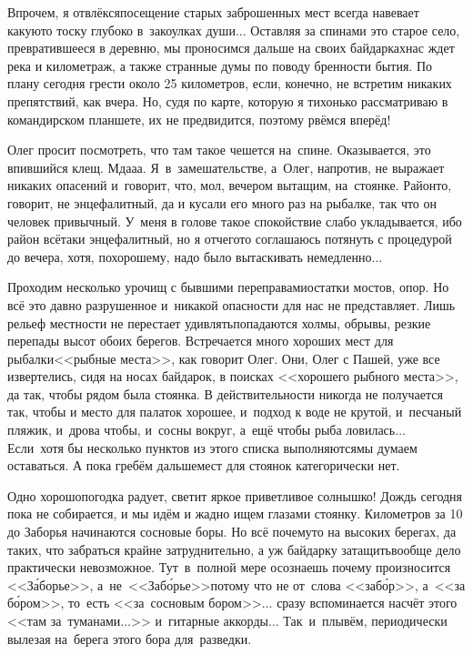 Впрочем, я отвлёкся\mdash посещение старых заброшенных мест всегда навевает какую\sdash то тоску глубоко в~закоулках души$\ldots$ Оставляя за спинами это старое село, превратившееся в деревню, мы проносимся дальше на своих байдарках\mdash нас ждет река и километраж, а также странные думы по поводу бренности бытия. По плану сегодня грести около 25 километров, если, конечно, не встретим никаких препятствий, как вчера. Но, судя по карте, которую я тихонько рассматриваю в командирском планшете, их не предвидится, поэтому рвёмся вперёд!

Олег просит посмотреть, что там такое чешется на~спине. Оказывается, это впившийся клещ. Мда\sdash а\sdash а. Я~в~замешательстве, а~Олег, напротив, не выражает никаких опасений и~говорит, что, мол, вечером вытащим, на~стоянке. Район\sdash то, говорит, не энцефалитный, да и кусали его много раз на рыбалке, так что он человек привычный. У~меня в голове такое спокойствие слабо укладывается, ибо район всё\sdash таки энцефалитный, но я отчего\sdash то соглашаюсь потянуть с процедурой до вечера, хотя, по\sdash хорошему, надо было вытаскивать немедленно$\ldots$

Проходим несколько урочищ с бывшими переправами\mdash остатки мостов, опор. Но всё это давно разрушенное и~никакой опасности для нас не представляет. Лишь рельеф местности не перестает удивлять\mdash попадаются холмы, обрывы, резкие перепады высот обоих берегов. Встречается много хороших мест для рыбалки\mdash <<рыбные места>>, как говорит Олег. Они, Олег с Пашей, уже все извертелись, сидя на носах байдарок, в поисках <<хорошего рыбного места>>, да так, чтобы рядом была стоянка. В действительности никогда не получается так, чтобы и место для палаток хорошее, и~подход к воде не крутой, и~песчаный пляжик, и~дрова чтобы, и~сосны вокруг, а~ещё чтобы рыба ловилась$\ldots$ Если~хотя бы несколько пунктов из этого списка выполняются\mdash мы думаем оставаться. А пока гребём дальше\mdash мест для стоянок категорически нет.

Одно хорошо\mdash погодка радует, светит яркое приветливое солнышко! Дождь сегодня пока не собирается, и мы идём и жадно ищем глазами стоянку. Километров за 10 до Заборья начинаются сосновые боры. Но всё почему\sdash то на высоких берегах, да таких, что забраться крайне затруднительно, а уж байдарку затащить\mdash вообще дело практически невозможное. Тут~в~полной мере осознаешь почему произносится <<З\'{а}борье>>, а~не~<<Заб\'{о}рье>>\mdash потому что не от~слова <<заб\'{о}р>>, а~<<за б\'{о}ром>>, то~есть <<за~сосновым бором>>$\ldots$ сразу вспоминается насчёт этого <<там за~туманами$\ldots$>> и~гитарные аккорды$\ldots$ Так~и~плывём, периодически вылезая на~берега этого бора для~разведки.

